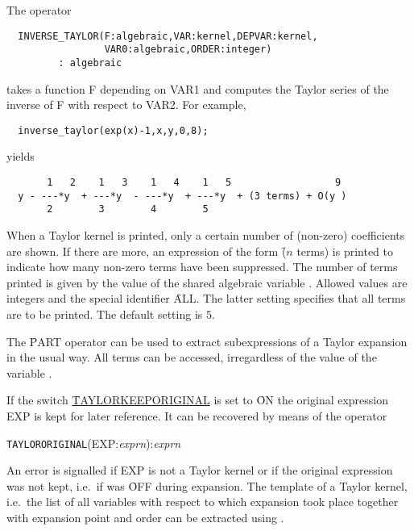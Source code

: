 \hypertarget{operator:INVERSE_TAYLOR}{}
The operator
\begin{verbatim}
  INVERSE_TAYLOR(F:algebraic,VAR:kernel,DEPVAR:kernel,
                 VAR0:algebraic,ORDER:integer)
         : algebraic
\end{verbatim}
takes a function F depending on VAR1 and computes the Taylor series of
the inverse of F with respect to VAR2. For example,
\begin{verbatim}
  inverse_taylor(exp(x)-1,x,y,0,8);
\end{verbatim}
yields
\begin{verbatim}
       1   2    1   3    1   4    1   5                  9
  y - ---*y  + ---*y  - ---*y  + ---*y  + (3 terms) + O(y )
       2        3        4        5
\end{verbatim}


\hypertarget{reserved:TAYLORPRINTTERMS}{}
When a Taylor kernel is printed, only a certain number of (non-zero)
coefficients are shown. If there are more, an expression of the form
\f{($n$ terms)} is printed to indicate how many non-zero
terms have been suppressed. The number of terms printed is given by
the value of the shared algebraic variable .
Allowed values are integers and the special identifier \f{ALL}. The
latter setting specifies that all terms are to be printed. The default
setting is $5$.

%
The \f{PART} operator can be used to extract subexpressions of a
Taylor expansion in the usual way. All terms can be accessed,
irregardless of the value of the variable .


If the switch \hyperlink{switch:TAYLORKEEPORIGINAL}{\f{TAYLORKEEPORIGINAL}}
is set to \f{ON} the
original expression EXP is kept for later reference.
It can be recovered by means of the operator

\hypertarget{operator:TAYLORORIGINAL}{}
\hspace*{2em} \texttt{TAYLORORIGINAL}(EXP:{\em exprn}):{\em exprn}

An error is signalled if EXP is not a Taylor kernel or if the original
expression was not kept, i.e.\ if  was
\f{OFF} during expansion.  The template of a Taylor kernel, i.e.\
the list of all variables with respect to which expansion took place
together with expansion point and order can be extracted using
.

